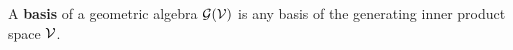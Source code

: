 \begin{definition}\label{d:basis}
	A \textbf{basis} of a geometric algebra $\mathcal{G}(\mathcal{V})$ is any basis of the generating inner product space $\mathcal{V}$.
\end{definition}
